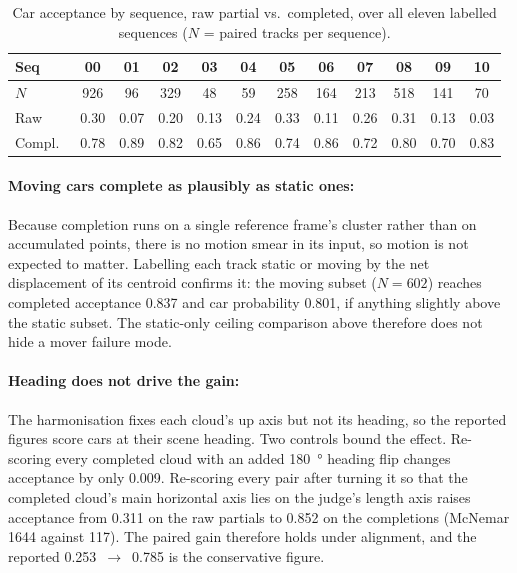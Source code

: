 \begin{table}[H]
  \centering
  \caption[Plausibility acceptance by sequence]{Car acceptance by sequence, raw partial vs.\
    completed, over all eleven labelled sequences ($N$ = paired tracks per sequence).}
  \label{tab:plausibility-seq}
  \small
  \setlength{\tabcolsep}{4.5pt}
  \begin{tabular}{lccccccccccc}
    \toprule
    Seq & 00 & 01 & 02 & 03 & 04 & 05 & 06 & 07 & 08 & 09 & 10 \\
    \midrule
    $N$ & 926 & 96 & 329 & 48 & 59 & 258 & 164 & 213 & 518 & 141 & 70 \\
    Raw & 0.30 & 0.07 & 0.20 & 0.13 & 0.24 & 0.33 & 0.11 & 0.26 & 0.31 & 0.13 & 0.03 \\
    Compl.\ & 0.78 & 0.89 & 0.82 & 0.65 & 0.86 & 0.74 & 0.86 & 0.72 & 0.80 & 0.70 & 0.83 \\
    \bottomrule
  \end{tabular}
\end{table}

\paragraph{Moving cars complete as plausibly as static ones:}
\label{sec:results-movers}
Because completion runs on a single reference frame's cluster rather than on accumulated
points, there is no motion smear in its input, so motion is not expected to matter. Labelling
each track static or moving by the net displacement of its centroid confirms it: the moving
subset ($N=\num{602}$) reaches completed acceptance \num{0.837} and car probability
\num{0.801}, if anything slightly above the static subset. The static-only ceiling comparison
above therefore does not hide a mover failure mode.

\paragraph{Heading does not drive the gain:} The harmonisation fixes each cloud's up axis but
not its heading, so the reported figures score cars at their scene heading. Two controls
bound the effect. Re-scoring every completed cloud with an added \SI{180}{\degree} heading
flip changes acceptance by only \num{0.009}. Re-scoring every pair after turning it so that
the completed cloud's main horizontal axis lies on the judge's length axis raises acceptance
from \num{0.311} on the raw partials to \num{0.852} on the completions (McNemar \num{1644}
against \num{117}). The paired gain therefore holds under alignment, and the reported
\num{0.253}~$\to$~\num{0.785} is the conservative figure.

